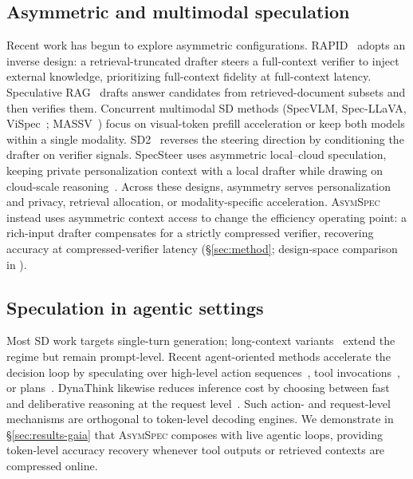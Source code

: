 \documentclass[11pt]{article}
\newcommand{\crchange}[1]{#1}
\theoremstyle{plain}
\theoremstyle{definition}
\begin{document}
\subsection{Asymmetric and multimodal speculation}
Recent work has begun to explore asymmetric configurations. RAPID~\citep{liu2025rapid} adopts an inverse design: a retrieval-truncated drafter steers a full-context verifier to inject external knowledge, prioritizing full-context fidelity at full-context latency. Speculative RAG~\citep{wang2024specrag} drafts answer candidates from retrieved-document subsets and then verifies them. Concurrent multimodal SD methods (SpecVLM, Spec-LLaVA, ViSpec~\citep{specvlm2025,specllava2025,vispec2025}; MASSV~\citep{massv2025}) focus on visual-token prefill acceleration or keep both models within a single modality. SD2~\citep{sd2_2025} reverses the steering direction by conditioning the drafter on verifier signals. \crchange{SpecSteer uses asymmetric local--cloud speculation, keeping private personalization context with a local drafter while drawing on cloud-scale reasoning~\citep{lv-etal-2026-specsteer}. Across these designs, asymmetry serves personalization and privacy, retrieval allocation, or modality-specific acceleration. \textsc{AsymSpec} instead uses asymmetric context access to change the efficiency operating point: a rich-input drafter compensates for a strictly compressed verifier, recovering accuracy at compressed-verifier latency} (\S\ref{sec:method}; design-space comparison in ).

\subsection{Speculation in agentic settings}
Most SD work targets single-turn generation; long-context variants~\citep{triforce2024,magicdec2025} extend the regime but remain prompt-level. Recent agent-oriented methods accelerate the decision loop by speculating over high-level action sequences~\citep{agentspec2024}, tool invocations~\citep{toolspec2024}, or plans~\citep{speculative_planning2025}. \crchange{DynaThink likewise reduces inference cost by choosing between fast and deliberative reasoning at the request level~\citep{DBLP:conf/emnlp/Pan0ZL0024}. Such action- and request-level mechanisms} are orthogonal to token-level decoding engines. We demonstrate in \S\ref{sec:results-gaia} that \textsc{AsymSpec} composes with live agentic loops, providing token-level accuracy recovery whenever tool outputs or retrieved contexts are compressed online.
\end{document}
